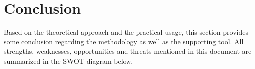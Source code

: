 
\section{Conclusion}
\label{sec:conclusion}
Based on the theoretical approach and the practical usage, this section provides some conclusion regarding the methodology as well as the supporting tool.
All strengths, weaknesses, opportunities and threats mentioned in this document are summarized in the SWOT diagram below.


\begin{table}[h]
\caption{SWOT Analysis}
\label{SWOT Analysis}
\end{table}
